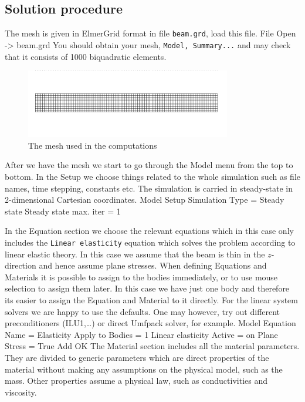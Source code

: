 \subsection*{Solution procedure}

The mesh is given in ElmerGrid format in file \texttt{beam.grd}, load this file.
\ttbegin
File 
  Open -> beam.grd
\ttend
You should obtain your mesh, \texttt{Model, Summary...} and may check that
it consists of 1000 biquadratic elements.
\begin{figure}[h!]
\begin{center}
  \includegraphics[width=0.8\textwidth,viewport=0 30 900 270,clip]{beammesh}
  \caption{The mesh used in the computations}
  \label{fig:elast_mesh}
\end{center}
\end{figure}

After we have the mesh we start to go through the Model menu from the top to bottom. 
In the Setup we choose things related to the whole simulation such as file names, 
time stepping, constants etc.
The simulation is carried in steady-state in 2-dimensional Cartesian coordinates. 
\ttbegin
Model
  Setup 
    Simulation Type = Steady state
    Steady state max. iter = 1
\ttend

In the Equation section we choose the relevant equations which in this case only includes 
the \texttt{Linear elasticity} equation which solves the problem according to 
linear elastic theory.
In this case we assume that the beam is thin in the $z$-direction and hence assume plane stresses.
When defining Equations and Materials it is possible to assign to the bodies immediately, or to use mouse
selection to assign them later. In this case we have just one body and therefore its easier to assign 
the Equation and Material to it directly.
For the linear system solvers we are happy to use the defaults. One may however, try out different
preconditioners (ILU1,\ldots) or direct Umfpack solver, for example.
\ttbegin
Model
  Equation
    Name = Elasticity
    Apply to Bodies = 1
    Linear elasticity
      Active = on
      Plane Stress = True
    Add 
    OK
\ttend        
The Material section includes all the material parameters.
They are divided to generic parameters which are direct properties of the material
without making any assumptions on the physical model, such as the mass. Other properties assume
a physical law, such as conductivities and viscosity. 

